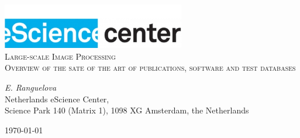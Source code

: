 \documentclass[a4paper,11pt]{article}
\begin{document}
\begin{titlepage}
\begin{center}
\includegraphics[width=0.6\textwidth]{fig/logo}\\[3cm]    
\textsc{\LARGE Large-scale Image Processing}\\[0.5cm]
\textsc{\large Overview of the sate of the art of publications, software and test databases}\\[0.5cm]
\vfill
\end{center}
{\large
\emph{E. Ranguelova} \\
}
{\large
{Netherlands eScience Center, \\
Science Park 140 (Matrix 1), 1098 XG Amsterdam, the Netherlands\\
}
}
\begin{center}
{\large \today}
\end{center}
\end{titlepage}

\tableofcontents

\newpage


\end{document}
